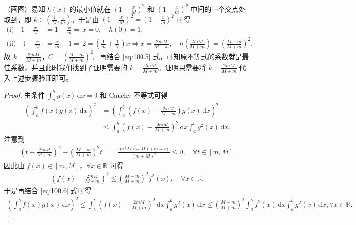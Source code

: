 \documentclass[../../main.tex]{subfiles}
\begin{document}
\begin{remark}
（画图）易知 \(h(x)\) 的最小值就在 \(\left( 1 - \frac{x}{M} \right)^2\) 和 \(\left( 1 - \frac{x}{m} \right)^2\) 中间的一个交点处取到，即 \(k \in \left( \frac{1}{M}, \frac{1}{m} \right)\)。于是由 \(\left( 1 - \frac{x}{M} \right)^2 = \left( 1 - \frac{x}{m} \right)^2\) 可得
\begin{align*}
\text{(i)} \quad 1 - \frac{x}{M} &= 1 - \frac{x}{m} \Longrightarrow x = 0, \quad h(0) = 1, \\
\text{(ii)} \quad 1 - \frac{x}{M} &= \frac{x}{m} - 1 \Longrightarrow 2 = \left( \frac{1}{m} + \frac{1}{M} \right) x \Longrightarrow x = \frac{2mM}{M + m}, \quad h\left( \frac{2mM}{M + m} \right) = \left( \frac{M - m}{M + m} \right)^2.
\end{align*}
故 \(k = \frac{2mM}{M + m}\)，\(C = \left( \frac{M - m}{M + m} \right)^2\)。再结合 \eqref{eq:100.5} 式，可知原不等式的系数就是最佳系数，并且此时我们找到了证明需要的 \(k = \frac{2mM}{M + m}\)。证明只需要将 \(k = \frac{2mM}{M + m}\) 代入上述步骤验证即可。
\end{remark}
\begin{proof}
由条件 \(\int_a^b g(x) \, \mathrm{d}x = 0\) 和 Cauchy 不等式可得
\begin{align}
\left( \int_a^b f(x) g(x) \, \mathrm{d}x \right)^2 &= \left( \int_a^b \left( f(x) - \frac{2mM}{M + m} \right) g(x) \, \mathrm{d}x \right)^2 \nonumber \\
&\leqslant \int_a^b \left( f(x) - \frac{2mM}{M + m} \right)^2 \, \mathrm{d}x \int_a^b g^2(x) \, \mathrm{d}x. \label{eq:100.6}
\end{align}
注意到
\begin{align*}
\left( t - \frac{2mM}{M + m} \right)^2 - \left( \frac{M - m}{M + m} \right)^2 t &= \frac{4mM \left( t - M \right) \left( m - t \right)}{\left( m + M \right)^2} \leqslant 0, \quad \forall t \in [m, M].
\end{align*}
因此由 \(f(x) \in [m, M]\)，\(\forall x \in \mathbb{R}\) 可得
\begin{align*}
\left( f(x) - \frac{2mM}{M + m} \right)^2 \leqslant \left( \frac{M - m}{M + m} \right)^2 f^2(x), \quad \forall x \in \mathbb{R}.
\end{align*}
于是再结合 \eqref{eq:100.6} 式可得
\begin{align*}
\left( \int_a^b f(x) g(x) \, \mathrm{d}x \right)^2 \leqslant \int_a^b \left( f(x) - \frac{2mM}{M + m} \right)^2 \, \mathrm{d}x \int_a^b g^2(x) \, \mathrm{d}x 
\leqslant \left( \frac{M - m}{M + m} \right)^2 \int_a^b f^2(x) \, \mathrm{d}x \int_a^b g^2(x) \, \mathrm{d}x, \forall x \in \mathbb{R}.
\end{align*}
\end{proof}
\end{document}
